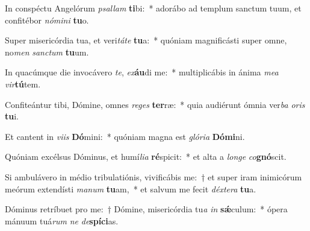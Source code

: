 \item In conspéctu Angelórum \textit{psal}\textit{lam} \textbf{ti}bi:~* adorábo ad templum sanctum tuum, et confitébor \textit{nó}\textit{mi}\textit{ni} \textbf{tu}o.
\item Super misericórdia tua, et veri\textit{tá}\textit{te} \textbf{tu}a:~* quóniam magnificásti super omne, no\textit{men} \textit{sanc}\textit{tum} \textbf{tu}um.
\item In quacúmque die invocávero \textit{te}, \textit{ex}\textbf{áu}di me:~* multiplicábis in ánima \textit{me}\textit{a} \textit{vir}\textbf{tú}tem.
\item Confiteántur tibi, Dómine, omnes \textit{re}\textit{ges} \textbf{ter}ræ:~* quia audiérunt ómnia ver\textit{ba} \textit{o}\textit{ris} \textbf{tu}i.
\item Et cantent in \textit{vi}\textit{is} \textbf{Dó}mini:~* quóniam magna est \textit{gló}\textit{ri}\textit{a} \textbf{Dó}\textbf{mi}ni.
\item Quóniam excélsus Dóminus, et humí\textit{li}\textit{a} \textbf{ré}spicit:~* et alta a \textit{lon}\textit{ge} \textit{co}\textbf{gnó}scit.
\item Si ambulávero in médio tribulatiónis, vivificábis me:~† et super iram inimicórum meórum extendísti \textit{ma}\textit{num} \textbf{tu}am,~* et salvum me fecit \textit{déx}\textit{te}\textit{ra} \textbf{tu}a.
\item Dóminus retríbuet pro me:~† Dómine, misericórdia tu\textit{a} \textit{in} \textbf{sǽ}culum:~* ópera mánuum tuá\textit{rum} \textit{ne} \textit{de}\textbf{spí}\textbf{ci}as.
